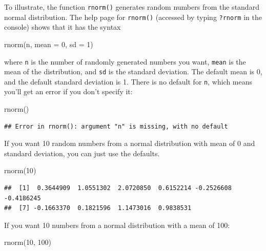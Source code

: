 \documentclass[
  oneside]{book}
\newenvironment{Shaded}{\begin{snugshade}}{\end{snugshade}}
\newcommand{\AttributeTok}[1]{\textcolor[rgb]{0.77,0.63,0.00}{#1}}
\newcommand{\DecValTok}[1]{\textcolor[rgb]{0.00,0.00,0.81}{#1}}
\newcommand{\FunctionTok}[1]{\textcolor[rgb]{0.00,0.00,0.00}{#1}}
\newcommand{\NormalTok}[1]{#1}
\begin{document}
To illustrate, the function \texttt{rnorm()} generates random numbers from the standard normal distribution. The help page for \texttt{rnorm()} (accessed by typing \texttt{?rnorm} in the console) shows that it has the syntax

\begin{Shaded}
\begin{Highlighting}[]
\FunctionTok{rnorm}\NormalTok{(n, }\AttributeTok{mean =} \DecValTok{0}\NormalTok{, }\AttributeTok{sd =} \DecValTok{1}\NormalTok{)}
\end{Highlighting}
\end{Shaded}

where \texttt{n} is the number of randomly generated numbers you want, \texttt{mean} is the mean of the distribution, and \texttt{sd} is the standard deviation. The default mean is 0, and the default standard deviation is 1. There is no default for \texttt{n}, which means you'll get an error if you don't specify it:

\begin{Shaded}
\begin{Highlighting}[]
\FunctionTok{rnorm}\NormalTok{()}
\end{Highlighting}
\end{Shaded}

\begin{verbatim}
## Error in rnorm(): argument "n" is missing, with no default
\end{verbatim}

If you want 10 random numbers from a normal distribution with mean of 0 and standard deviation, you can just use the defaults.

\begin{Shaded}
\begin{Highlighting}[]
\FunctionTok{rnorm}\NormalTok{(}\DecValTok{10}\NormalTok{)}
\end{Highlighting}
\end{Shaded}

\begin{verbatim}
##  [1]  0.3644909  1.0551302  2.0720850  0.6152214 -0.2526608 -0.4186245
##  [7] -0.1663370  0.1821596  1.1473016  0.9838531
\end{verbatim}

If you want 10 numbers from a normal distribution with a mean of 100:

\begin{Shaded}
\begin{Highlighting}[]
\FunctionTok{rnorm}\NormalTok{(}\DecValTok{10}\NormalTok{, }\DecValTok{100}\NormalTok{)}
\end{Highlighting}
\end{Shaded}
\end{document}
